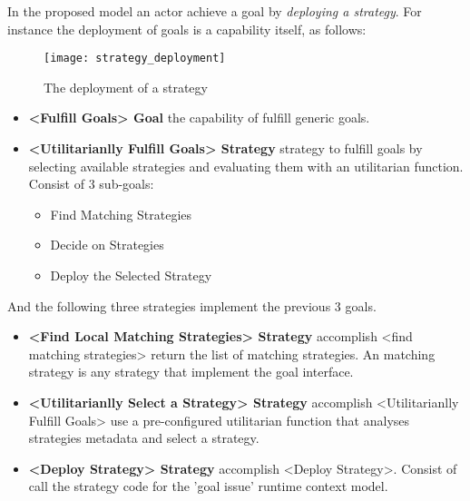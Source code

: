 In the proposed model an actor achieve a goal by \emph{deploying a strategy}. For instance the deployment of goals is a capability itself, as follows:

\begin{figure}
  \centering
  \texttt{[image: strategy\_deployment]}
  \caption{The deployment of a strategy}
  \label{fig:agent_composition}
\end{figure}

\begin{itemize}

\item \textbf{<Fulfill Goals> Goal} the capability of fulfill generic goals.

\item \textbf{<Utilitarianlly Fulfill Goals> Strategy } strategy to fulfill goals by selecting available strategies and evaluating them with an utilitarian function. Consist of 3 sub-goals:
  \begin{itemize}
    \item Find Matching Strategies
    \item Decide on Strategies
    \item Deploy the Selected Strategy
  \end{itemize}
\end{itemize}

And the following three strategies implement the previous 3 goals.

\begin{itemize}
  \item \textbf{<Find Local Matching Strategies> Strategy} accomplish <find matching strategies>
  return the list of matching strategies. An matching strategy is any strategy that implement the goal interface.

  \item \textbf{<Utilitarianlly Select a Strategy> Strategy} accomplish <Utilitarianlly Fulfill Goals>
  use a pre-configured utilitarian function that analyses strategies metadata and select a strategy.

  \item \textbf{<Deploy Strategy> Strategy} accomplish <Deploy Strategy>.
  Consist of call the strategy code for the 'goal issue' runtime context model.
\end{itemize}

%
%
%
%
%
%
%
